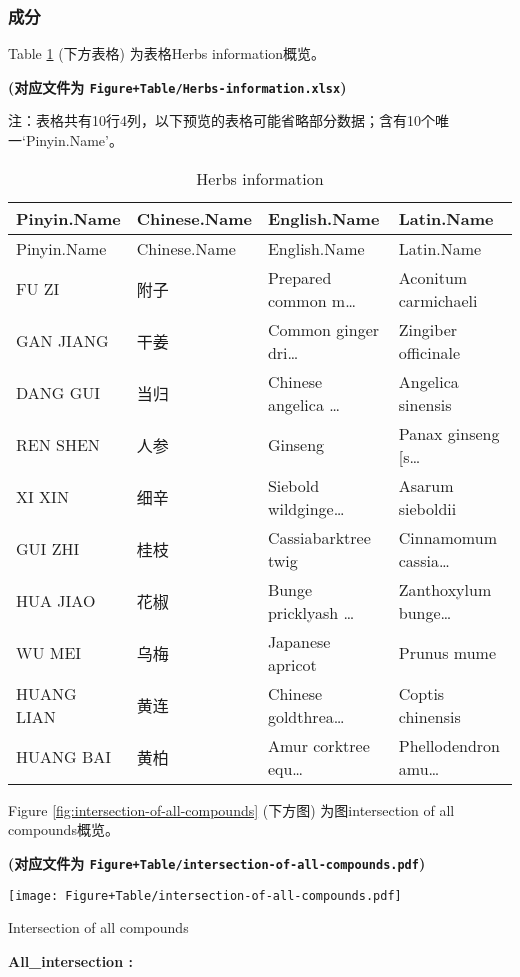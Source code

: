 \documentclass[
]{article}
\begin{document}
\hypertarget{ux6210ux5206}{%
\subsubsection{成分}\label{ux6210ux5206}}

Table \ref{tab:Herbs-information} (下方表格) 为表格Herbs information概览。

\textbf{(对应文件为 \texttt{Figure+Table/Herbs-information.xlsx})}

\begin{center}\begin{tcolorbox}[colback=gray!10, colframe=gray!50, width=0.9\linewidth, arc=1mm, boxrule=0.5pt]注：表格共有10行4列，以下预览的表格可能省略部分数据；含有10个唯一`Pinyin.Name'。
\end{tcolorbox}
\end{center}

\begin{longtable}[]{@{}llll@{}}
\caption{\label{tab:Herbs-information}Herbs information}\tabularnewline
\toprule
Pinyin.Name & Chinese.Name & English.Name & Latin.Name\tabularnewline
\midrule
\endfirsthead
\toprule
Pinyin.Name & Chinese.Name & English.Name & Latin.Name\tabularnewline
\midrule
\endhead
FU ZI & 附子 & Prepared common m\ldots{} & Aconitum carmichaeli\tabularnewline
GAN JIANG & 干姜 & Common ginger dri\ldots{} & Zingiber officinale\tabularnewline
DANG GUI & 当归 & Chinese angelica \ldots{} & Angelica sinensis\tabularnewline
REN SHEN & 人参 & Ginseng & Panax ginseng {[}s\ldots{}\tabularnewline
XI XIN & 细辛 & Siebold wildginge\ldots{} & Asarum sieboldii\tabularnewline
GUI ZHI & 桂枝 & Cassiabarktree twig & Cinnamomum cassia\ldots{}\tabularnewline
HUA JIAO & 花椒 & Bunge pricklyash \ldots{} & Zanthoxylum bunge\ldots{}\tabularnewline
WU MEI & 乌梅 & Japanese apricot & Prunus mume\tabularnewline
HUANG LIAN & 黄连 & Chinese goldthrea\ldots{} & Coptis chinensis\tabularnewline
HUANG BAI & 黄柏 & Amur corktree equ\ldots{} & Phellodendron amu\ldots{}\tabularnewline
\bottomrule
\end{longtable}

Figure \ref{fig:intersection-of-all-compounds} (下方图) 为图intersection of all compounds概览。

\textbf{(对应文件为 \texttt{Figure+Table/intersection-of-all-compounds.pdf})}

\def\@captype{figure}
\begin{center}
\texttt{[image: Figure+Table/intersection-of-all-compounds.pdf]}
\caption{Intersection of all compounds}\label{fig:intersection-of-all-compounds}
\end{center}
\begin{center}\begin{tcolorbox}[colback=gray!10, colframe=gray!50, width=0.9\linewidth, arc=1mm, boxrule=0.5pt]
\textbf{
All\_intersection
:}

\vspace{0.5em}



\vspace{2em}
\end{tcolorbox}
\end{center}
\end{document}
